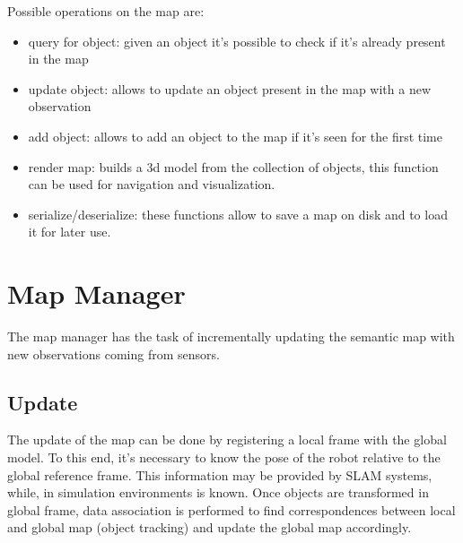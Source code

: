 \documentclass{article}
\begin{document}
	\noindent
	Possible operations on the map are:
	
	\begin{itemize}
		\item query for object: given an object it's possible to check if it's already present in the map
		\item update object: allows to update an object present in the map with a new observation
		\item add object: allows to add an object to the map if it's seen for the first time
		\item render map: builds a 3d model from the collection of objects, this function can be used for navigation and visualization.
		\item serialize/deserialize: these functions allow to save a map on disk and to load it for later use.
	\end{itemize}
	
	\section{Map Manager}
	
	The map manager has the task of incrementally updating the semantic map with new observations coming from sensors.
	
	\subsection{Update}
	
	The update of the map can be done by registering a local frame with the global model. To this end, it's necessary to know the pose of the robot relative to the global reference frame. This information may be provided by SLAM systems, while, in simulation environments is known. Once objects are transformed in global frame, data association is performed to find correspondences between local and global map (object tracking) and update the global map accordingly.
	
\end{document}
